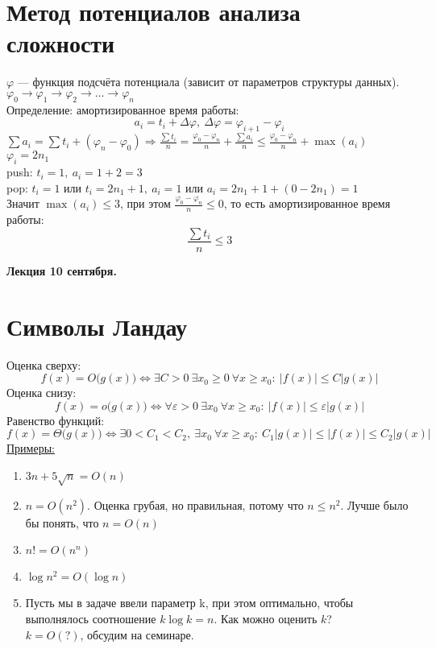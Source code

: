 \documentclass[12pt, a4paper]{article}
\begin{document}
    \section{Метод потенциалов анализа сложности}
        $\varphi$ --- функция подсчёта потенциала (зависит от параметров структуры данных).\\
        $\varphi_0\rightarrow \varphi_1 \rightarrow \varphi_2 \rightarrow\dots\rightarrow  \varphi_n$\\
        Определение: амортизированное время работы:\[a_i = t_i + \Delta \varphi,\ \Delta \varphi = \varphi_{i + 1} - \varphi_i\]
        $\sum a_i = \sum t_i + (\varphi_n - \varphi_0)\Rightarrow \frac{\sum t_i}{n} = \frac{\varphi_0 - \varphi_n}{n} + \frac{\sum a_i}{n} \leq \frac{\varphi_0 - \varphi_n}{n} + \max(a_i)$\\
        $\varphi_i = 2n_1$\\
        push: $t_i = 1,\ a_i = 1 + 2 = 3$\\
        pop: $t_i = 1\text{ или } t_i = 2n_1 + 1,\ a_i = 1\text{ или } a_i = 2n_1 + 1 + (0 - 2n_1) = 1$\\
        Значит $\max(a_i) \leq 3$, при этом $\frac{\varphi_0 - \varphi_n}{n} \leq 0$, то есть амортизированное время работы:
        \[\frac{\sum t_i}{n} \leq 3\]
    \begin{center}
        \textbf{Лекция 10 сентября.}
    \end{center}
    \section{Символы Ландау}
    Оценка сверху:
    \[f(x) = O\big(g(x)\big)\Leftrightarrow \exists C > 0\ \exists x_0 \geq 0\ \forall x\geq x_0:\ |f(x)|\leq C|g(x)|\]
    Оценка снизу:
    \[f(x) = o\big(g(x)\big)\Leftrightarrow \forall \varepsilon > 0\ \exists x_0\ \forall x\geq x_0:\ |f(x)| \leq \varepsilon|g(x)|\]
    Равенство функций:
    \[f(x) = \Theta\big(g(x)\big)\Leftrightarrow \exists 0 < C_1 < C_2,\ \exists x_0\ \forall x \geq x_0:\ C_1|g(x)| \leq |f(x)| \leq C_2|g(x)|\]
    \underline{Примеры:}
    \begin{enumerate}
        \item $3n + 5\sqrt{n} = O(n)$
        \item $n = O(n^2)$. Оценка грубая, но правильная, потому что $n \leq n^2$. Лучше было бы понять, что $n = O(n)$
        \item $n! = O(n^n)$
        \item $\log n^2 = O(\log n)$
        \item Пусть мы в задаче ввели параметр k, при этом оптимально, чтобы выполнялось соотношение $k\log k = n$. Как можно оценить $k$?\\
        $k = O(?)$, обсудим на семинаре.
    \end{enumerate}
\end{document}
